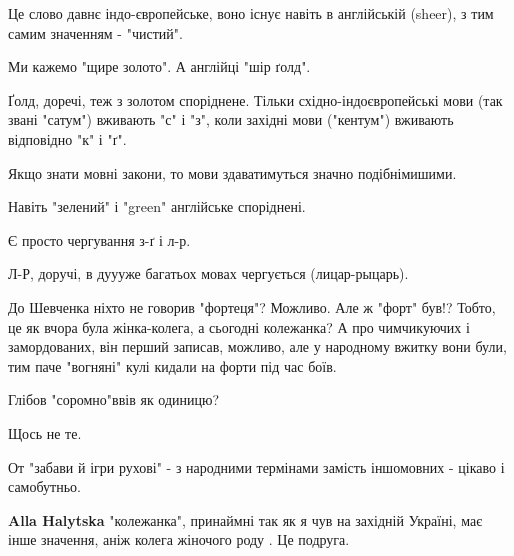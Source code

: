 \begin{itemize}
\begin{itemize}
Це слово давнє індо-європейське, воно існує навіть в англійській (sheer), з тим самим значенням - "чистий".

Ми кажемо "щире золото". А англійці "шір ґолд".

Ґолд, доречі, теж з золотом споріднене. Тільки східно-індоєвропейські мови (так звані "сатум") вживають "с" і "з", коли західні мови ("кентум") вживають відповідно "к" і "ґ".

Якщо знати мовні закони, то мови здаватимуться значно подібнімишими.

Навіть "зелений" і "green" англійське споріднені.

Є просто чергування з-ґ і л-р.

Л-Р, доручі, в дуууже багатьох мовах чергується (лицар-рыцарь).
\end{itemize}

 

До Шевченка ніхто не говорив "фортеця"? Можливо. Але ж "форт" був!? Тобто, це
як вчора була жінка-колега, а сьогодні колежанка? А про чимчикуючих і
замордованих, він перший записав, можливо, але у народному вжитку вони були,
тим паче "вогняні" кулі кидали на форти під час боїв.

Глібов "соромно"ввів як одиницю?

Щось не те.

От "забави й ігри рухові" - з народними термінами замість іншомовних - цікаво і
самобутньо.

\begin{itemize}
 
\textbf{Alla Halytska} "колежанка", принаймні так як я чув на західній Україні, має інше значення, аніж колега жіночого роду \Smiley[1.0][yellow]. Це подруга.

 

\end{itemize}
\end{itemize}
